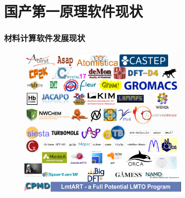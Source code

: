 \documentclass[cjk,slidestop,compress,mathserif,blue]{beamer}
\begin{document}

\subject{}
\frame
{
	\frametitle{\fontsize{9.5pt}{5.2pt}\selectfont{\textcolor{orange}{我国科学计算软件的现状、问题及对策研讨会}}}
\titlepage
}

\section*{}

\small
\section{国产第一原理软件现状}
\frame
{
	\frametitle{材料计算软件发展现状}
\begin{figure}[h!]
\vspace*{-0.16in}
\centering
\includegraphics[width=3.30in]{Figures/Softwares_logo.png}
\label{Softwares}
\end{figure}
}
\end{document}

